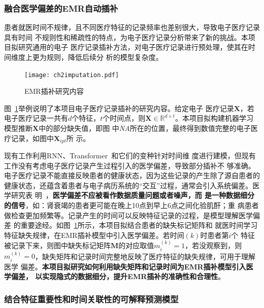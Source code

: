 \subsubsection{融合医学偏差的EMR自动插补}

患者就医时间不规律，且不同医疗特征的记录频率也差别很大，导致电子医疗记录具有时间
不规则性和稀疏性的特点，为电子医疗记录分析带来了新的挑战。本项目拟研究通用的电子
医疗记录插补方法，对电子医疗记录进行预处理，使其在时间维度上更为规则，降低后续分
析的模型复杂度。

\begin{figure}
    \begin{small}
        \begin{center}
            \texttt{[image: ch2imputation.pdf]}
        \end{center}
        \caption{EMR插补研究内容}
        \label{fig:ch2:imputation}
    \end{small}
\end{figure}

图~\ref{fig:ch2:imputation}举例说明了本项目电子医疗记录插补的研究内容。给定电子
医疗记录$\bm X$，若电子医疗记录一共有$d$个特征，$t$个时间点，则$\bm X \in
\mathbb{R}^{d\times t}$。本项目拟构建机器学习模型推断$\bm X$中的部分缺失值，即图
中\textit{NA}所在的位置，最终得到数值完整的电子医疗记录，如图中$\bm X_{ipt}$所
示。

现有工作利用RNN、Transformer~和它们的变种针对时间维
度进行建模，但现有工作没有考虑电子医疗记录产生过程引入的医学偏差，导致部分插补不
够准确。电子医疗记录不能直接反映患者的健康状态，因为这些记录的产生除了源自患者的
健康状态，还蕴含着患者与电子病历系统的“交互”过程，通常会引入系统偏差。医学研究表
明~，\textbf{医学偏差不应被看作数据质量问题或者噪声，而
是一种数据细分的信号}，如：肾衰竭的患者更可能在晚上10点到早上6点之间化验肌酐；重
病患者做检查更加频繁等。记录产生的时间可以反映特征记录的过程，是模型理解医学偏差
的重要途经。如图~\ref{fig:ch2:imputation}所示，本项目拟结合患者的缺失标记矩阵和
就医时间学习特征缺失规律，在EMR插补模型中引入医学偏差。若时间$(k)$时患者第$i$个
特征被记录下来，则图中缺失标记矩阵$\bm M$的对应取值$m_i^{(k)}=1$，若没观察到，则
$m_i^{(k)}=0$，缺失矩阵和记录时间完整地反映了医疗特征的缺失规律，可用于理解医学
偏差。\textbf{本项目拟研究如何利用缺失矩阵和记录时间为EMR插补模型引入医学偏差，
以实现隐式的数据细分，提升EMR插补的准确性和合理性}。

\subsubsection{结合特征重要性和时间关联性的可解释预测模型}

